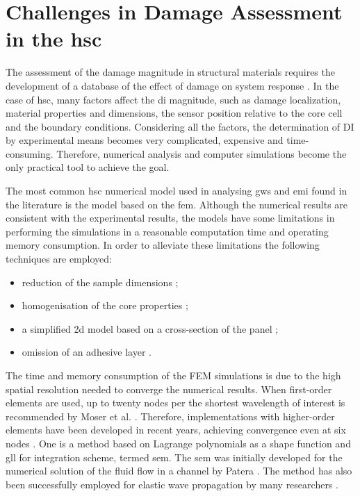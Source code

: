 \section{Challenges in Damage Assessment in the \ac{hsc}}
\label{sec:challenges}

The assessment of the damage magnitude in structural materials requires the development of a database of the effect of damage on system response \cite{worden2007fundamental}.
In the case of \ac{hsc}, many factors affect the \ac{di} magnitude, such as damage localization, material properties and dimensions, the sensor position relative to the core cell and the boundary conditions.
Considering all the factors, the determination of DI by experimental means becomes very complicated, expensive and time-consuming.
Therefore, numerical analysis and computer simulations become the only practical tool to achieve the goal.

The most common \ac{hsc} numerical model used in analysing \acp{gw} and \ac{emi} found in the literature is the model based on the \ac{fem}.
Although the numerical results are consistent with the experimental results, the models have some limitations in performing the simulations in a reasonable computation time and operating memory consumption.
In order to alleviate these limitations the following techniques are employed:
\begin{itemize}
\item reduction of the sample dimensions \cite{hosseini2013numerical, tian2015wavenumber};
\item homogenisation of the core properties \cite{catapano2014multi, zhou2020debonding};
\item a simplified \ac{2d} model based on a cross-section of the panel \cite{li2019detection};
\item omission of an adhesive layer \cite{mustapha2013non}.
\end{itemize}
The time and memory consumption of the FEM simulations is due to the high spatial resolution needed to converge the numerical results.
When first-order elements are used, up to twenty nodes per the shortest wavelength of interest is recommended by Moser et al. \cite{moser1999modeling}.
Therefore, implementations with higher-order elements have been developed in recent years, achieving convergence even at six nodes \cite{willberg2012comparison}.
One is a method based on Lagrange polynomials as a shape function and \ac{gll} for integration scheme, termed \ac{sem}.
The \ac{sem} was initially developed for the numerical solution of the fluid flow in a channel by Patera \cite{patera1984spectral}. The method has also been successfully employed for elastic wave propagation by many researchers \cite{seriani1994spectral, kudela2007wave, ostachowicz2011guided, rucka2010experimental, schulte2011simulation, lonkar2014modeling, rekatsinas2017cubic, yu2020time, li2021hybrid}.

